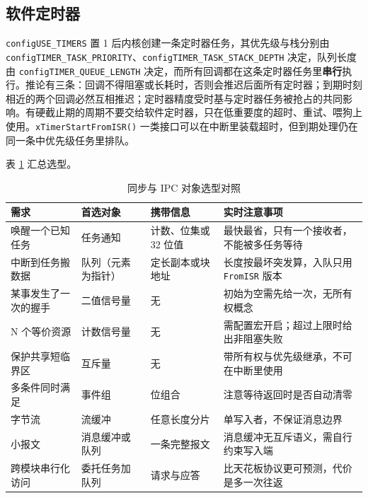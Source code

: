 \documentclass[12pt,a4paper,fontset=fandol]{ctexbook}
\newcommand{\Fn}[1]{\texttt{#1()}}
\newcommand{\Tp}[1]{\texttt{#1}}
\newcommand{\Bk}{\discretionary{}{}{}}
\begin{document}
\subsection{软件定时器}

\Tp{configUSE\_{\Bk}TIMERS} 置 1 后内核创建一条定时器任务，其优先级与栈分别由 \Tp{config{\Bk}TIMER\_{\Bk}TASK\_{\Bk}PRIORITY}、\Tp{config{\Bk}TIMER\_{\Bk}TASK\_{\Bk}STACK\_{\Bk}DEPTH} 决定，队列长度由 \Tp{config{\Bk}TIMER\_{\Bk}QUEUE\_{\Bk}LENGTH} 决定，而所有回调都在这条定时器任务里\textbf{串行}执行。推论有三条：回调不得阻塞或长耗时，否则会推迟后面所有定时器；到期时刻相近的两个回调必然互相推迟；定时器精度受时基与定时器任务被抢占的共同影响。有硬截止期的周期不要交给软件定时器，只在低重要度的超时、重试、喂狗上使用。\Fn{xTimerStartFromISR} 一类接口可以在中断里装载超时，但到期处理仍在同一条中优先级任务里排队。

表 \ref{tab:ch06-ipc-choice} 汇总选型。

\begin{table}[htbp]
\centering
\caption{同步与 IPC 对象选型对照}
\label{tab:ch06-ipc-choice}
\begin{tabular}{>{\raggedright\arraybackslash}p{} >{\raggedright\arraybackslash}p{} >{\raggedright\arraybackslash}p{} >{\raggedright\arraybackslash}p{}}
\toprule
需求 & 首选对象 & 携带信息 & 实时注意事项 \\
\midrule
唤醒一个已知任务 & 任务通知 & 计数、位集或 32 位值 & 最快最省，只有一个接收者，不能被多任务等待 \\
中断到任务搬数据 & 队列（元素为指针） & 定长副本或块地址 & 长度按最坏突发算，入队只用 \Tp{FromISR} 版本 \\
某事发生了一次的握手 & 二值信号量 & 无 & 初始为空需先给一次，无所有权概念 \\
N 个等价资源 & 计数信号量 & 无 & 需配置宏开启；超过上限时给出非阻塞失败 \\
保护共享短临界区 & 互斥量 & 无 & 带所有权与优先级继承，不可在中断里使用 \\
多条件同时满足 & 事件组 & 位组合 & 注意等待返回时是否自动清零 \\
字节流 & 流缓冲 & 任意长度分片 & 单写入者，不保证消息边界 \\
小报文 & 消息缓冲或队列 & 一条完整报文 & 消息缓冲无互斥语义，需自行约束写入端 \\
跨模块串行化访问 & 委托任务加队列 & 请求与应答 & 比天花板协议更可预测，代价是多一次往返 \\
\bottomrule
\end{tabular}
\end{table}
\end{document}
